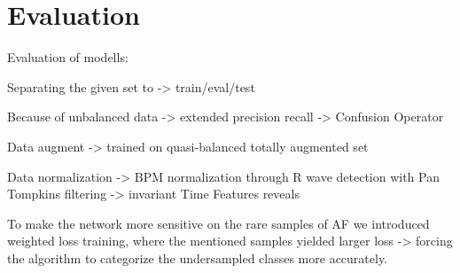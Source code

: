\section{Evaluation}

Evaluation of modells:

Separating the given set to -> train/eval/test

Because of unbalanced data -> extended precision recall -> Confusion Operator

Data augment -> trained on quasi-balanced totally augmented set

Data normalization -> BPM normalization through R wave detection with Pan Tompkins filtering -> invariant Time Features reveals

To make the network more sensitive on the rare samples of AF we introduced weighted loss training, where the mentioned samples yielded larger loss -> forcing the algorithm to categorize the undersampled classes more accurately.
